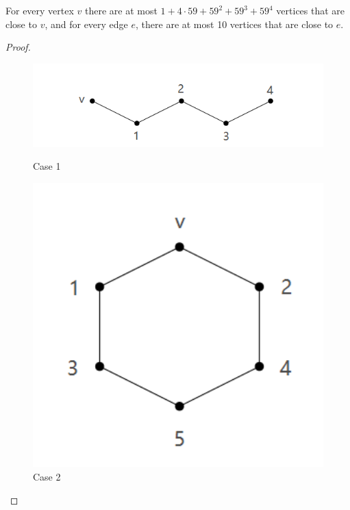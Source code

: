 \begin{claim}
For every vertex $v$ there are at most $1 + 4 \cdot 59 + 59^{2} + 59^{3} + 59^{4}$ vertices that are close to $v$, and for every edge $e$, there are at most 10 vertices that are close to $e$. \cite{dvorak2013threecoloring}
\end{claim}
\begin{proof}
    
    \begin{figure}[htbp]
    \centering
    \begin{minipage}[t]{0.48\textwidth}
    \centering
    \includegraphics[width=1\textwidth]{figure/592.png}
    \caption{Case 1}
    \end{minipage}
    \begin{minipage}[t]{0.28\textwidth}
    \centering
    \includegraphics[width=1\textwidth]{figure/591.png}
    \caption{Case 2}
    \end{minipage}
    \end{figure}

\end{proof}
